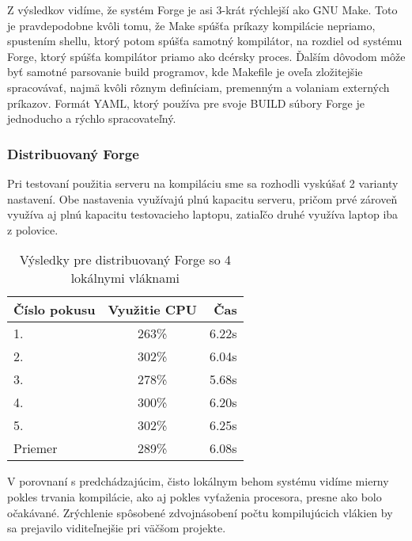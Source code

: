 Z výsledkov vidíme, že systém Forge je asi 3-krát rýchlejší ako GNU Make. Toto je
pravdepodobne kvôli tomu, že Make spúšťa príkazy kompilácie nepriamo, spustením shellu,
ktorý potom spúšťa samotný kompilátor, na rozdiel od systému Forge, ktorý spúšťa kompilátor
priamo ako dcérsky proces. Ďalším dôvodom môže byť samotné parsovanie build programov, kde
Makefile je oveľa zložitejšie spracovávať, najmä kvôli rôznym definíciam, premenným a volaniam
externých príkazov. Formát YAML, ktorý používa pre svoje BUILD súbory Forge je jednoducho
a rýchlo spracovateľný.

\subsubsection{Distribuovan\'{y} Forge}
\label{sec:results:forge}

Pri testovaní použitia serveru na kompiláciu sme sa rozhodli vyskúšať 2 varianty nastavení.
Obe nastavenia využívajú plnú kapacitu serveru, pričom prvé zároveň využíva aj plnú kapacitu
testovacieho laptopu, zatiaľčo druhé využíva laptop iba z polovice.

\begin{table}[H]
  \centering
  \begin{tabular}{| l || c | r |}
    \hline
    \v{C}\'{i}slo pokusu & Vyu\v{z}itie CPU & \v{C}as \\ \hline \hline
    1. & 263\% & 6.22s \\ \hline
    2. & 302\% & 6.04s \\ \hline
    3. & 278\% & 5.68s \\ \hline
    4. & 300\% & 6.20s \\ \hline
    5. & 302\% & 6.25s \\ \hline \hline
    Priemer & 289\% & 6.08s \\
    \hline
  \end{tabular}
  \caption{V\'{y}sledky pre distribuovan\'{y} Forge so 4 lok\'{a}lnymi vl\'{a}knami}
  \label{tbl:forge4}
\end{table}

V porovnaní s predchádzajúcim, čisto lokálnym behom systému vidíme mierny pokles
trvania kompilácie, ako aj pokles vyťaženia procesora, presne ako bolo očakávané.
Zrýchlenie spôsobené zdvojnásobení počtu kompilujúcich vlákien by sa prejavilo
viditeľnejšie pri väčšom projekte.


